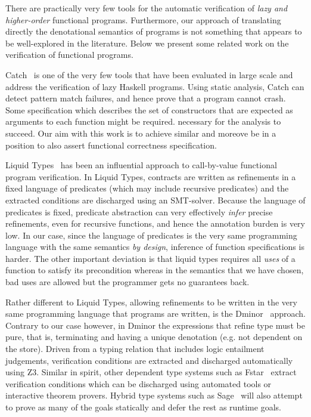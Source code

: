 There are practically very few tools for the automatic 
verification of {\em lazy and higher-order} functional programs.
Furthermore, our approach of translating directly the denotational semantics of 
programs is not something that appears to be well-explored in the literature. 
Below we present some related work on the verification of functional programs. 

Catch~\cite{Mitchell:2008:PBE:1411286.1411293} is one of the very few tools that 
have been evaluated in large scale and address the verification of lazy Haskell 
programs. Using static analysis, Catch can detect pattern match failures, and hence 
prove that a program cannot crash. Some specification which describes the set of 
constructors that are expected as arguments to each function might be required. 
necessary for the analysis to succeed. Our aim with this work is to achieve similar and
moreove be in a position to also assert functional correctness specification.

Liquid Types~\cite{Rondon:2008:LT:1375581.1375602} has been an influential 
approach to call-by-value functional program verification. In Liquid Types, 
contracts are written as refinements in a fixed language of predicates (which may 
include recursive predicates) and the extracted conditions are discharged using an 
SMT-solver. Because the language of predicates is fixed, predicate abstraction can 
very effectively {\em infer} precise refinements, even for recursive functions, and 
hence the annotation burden is very low. In our case, since the language of predicates
is the very same programming language with the same semantics {\em by design}, inference
of function specifications is harder. The other important deviation is that liquid types
requires all {\em uses} of a function to satisfy its precondition whereas in the semantics
that we have chosen, bad uses are allowed but the programmer gets no guarantees back.

Rather different to Liquid Types, allowing refinements to be written 
in the very same programming language that programs are written, is the 
Dminor~\cite{Bierman+:subtyping} approach. Contrary to our case however, in Dminor
the expressions that refine type must be pure, that is, terminating and having a unique
denotation (e.g. not dependent on the store). Driven from a typing relation that includes
logic entailment judgements, verification conditions are extracted and discharged automatically using Z3. 
Similar in spirit, other dependent type systems such 
as Fstar~\cite{fstar} extract verification conditions which can be discharged 
using automated tools 
or interactive theorem provers. Hybrid type systems such as Sage~\cite{Knowles+:sage}
will also attempt to prove as many of the goals statically and defer the rest as runtime
goals.

